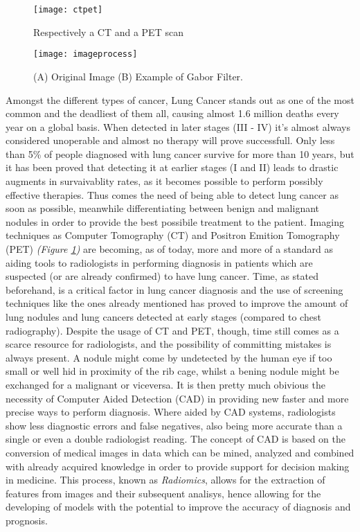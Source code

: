 \documentclass[../main.tex]{subfiles}
\begin{document}
\label{stateofart}
\thispagestyle{empty}

\begin{figure}[b]
\caption{Respectively a CT and a PET scan}
\centering
\texttt{[image: ctpet]}
\label{ctpet}
\end{figure}

\begin{figure}[b]
\caption{(A) Original Image (B) Example of Gabor Filter. \cite{Chaudhary2012}}
\centering
\texttt{[image: imageprocess]}
\label{imageprocess}
\end{figure}

Amongst the different types of cancer, Lung Cancer stands out as one of the most common and the deadliest of them all, causing almost 1.6 million deaths every year on a global basis.\cite{Wasserman2015} When detected in later stages (III - IV) it's almost always considered unoperable and almost no therapy will prove successfull. Only less than 5\% of people diagnosed with lung cancer survive for more than 10 years, but it has been proved that detecting it at earlier stages (I and II) leads to drastic augments in survaivablity rates,\cite{CancerResearchUK} as it becomes possible to perform possibly effective therapies. Thus comes the need of being able to detect lung cancer as soon as possible, meanwhile differentiating between benign and malignant nodules in order to provide the best possibile treatment to the patient. Imaging techniques as Computer Tomography (CT) and Positron Emition Tomography (PET) \textit{(Figure \ref{ctpet})} are becoming, as of today, more and more of a standard as aiding tools to radiologists in performing diagnosis in patients which are suspected (or are already confirmed) to have lung cancer.\cite{Indicators2017} Time, as stated beforehand, is a critical factor in lung cancer diagnosis and the use of screening techniques like the ones already mentioned has proved to improve the amount of lung nodules and lung cancers detected at early stages (compared to chest radiography).\cite{AlMohammad2017} Despite the usage of CT and PET, though, time still comes as a scarce resource for radiologists, and the possibility of committing mistakes is always present. A nodule might come by undetected by the human eye if too small or well hid in proximity of the rib cage, whilst a bening nodule might be exchanged for a malignant or viceversa. It is then pretty much obivious the necessity of Computer Aided Detection (CAD) in providing new faster and more precise ways to perform diagnosis. Where aided by CAD systems, radiologists show less diagnostic errors and false negatives, also being more accurate than a single or even a double radiologist reading.\cite{AlMohammad2017} The concept of CAD is based on the conversion of medical images in data which can be mined, analyzed and combined with already acquired knowledge in order to provide support for decision making in medicine. This process, known as \textit{Radiomics}, allows for the extraction of features from images and their subsequent analisys, hence allowing for the developing of models with the potential to improve the accuracy of diagnosis and prognosis.\cite{Gillies2016} 
\vspace{5mm}
\end{document}

